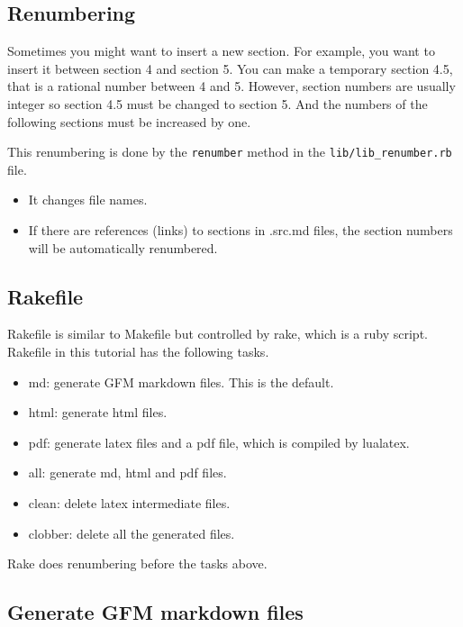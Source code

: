 \subsection{Renumbering}\label{renumbering}

Sometimes you might want to insert a new section. For example, you want
to insert it between section 4 and section 5. You can make a temporary
section 4.5, that is a rational number between 4 and 5. However, section
numbers are usually integer so section 4.5 must be changed to section 5.
And the numbers of the following sections must be increased by one.

This renumbering is done by the \texttt{renumber} method in the
\texttt{lib/lib\_renumber.rb} file.

\begin{itemize}
\tightlist
\item
  It changes file names.
\item
  If there are references (links) to sections in .src.md files, the
  section numbers will be automatically renumbered.
\end{itemize}

\subsection{Rakefile}\label{rakefile}

Rakefile is similar to Makefile but controlled by rake, which is a ruby
script. Rakefile in this tutorial has the following tasks.

\begin{itemize}
\tightlist
\item
  md: generate GFM markdown files. This is the default.
\item
  html: generate html files.
\item
  pdf: generate latex files and a pdf file, which is compiled by
  lualatex.
\item
  all: generate md, html and pdf files.
\item
  clean: delete latex intermediate files.
\item
  clobber: delete all the generated files.
\end{itemize}

Rake does renumbering before the tasks above.

\subsection{Generate GFM markdown
files}\label{generate-gfm-markdown-files}

